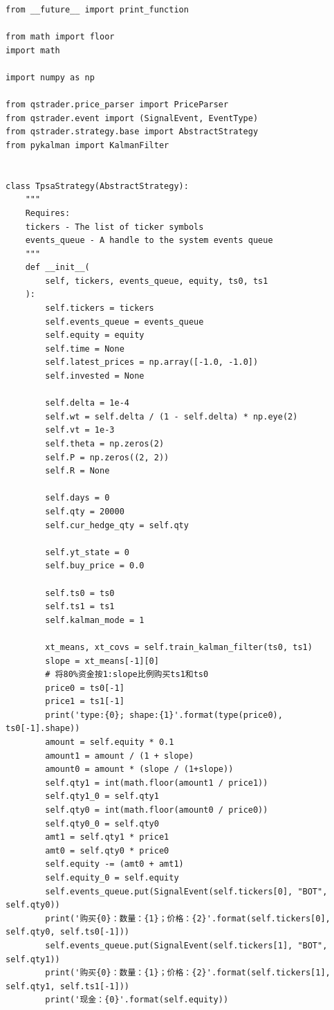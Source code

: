 \documentclass{article}
\begin{document}
\begin{lstlisting}
from __future__ import print_function

from math import floor
import math

import numpy as np

from qstrader.price_parser import PriceParser
from qstrader.event import (SignalEvent, EventType)
from qstrader.strategy.base import AbstractStrategy
from pykalman import KalmanFilter


class TpsaStrategy(AbstractStrategy):
    """
    Requires:
    tickers - The list of ticker symbols
    events_queue - A handle to the system events queue
    """
    def __init__(
        self, tickers, events_queue, equity, ts0, ts1
    ):
        self.tickers = tickers
        self.events_queue = events_queue
        self.equity = equity
        self.time = None
        self.latest_prices = np.array([-1.0, -1.0])
        self.invested = None

        self.delta = 1e-4
        self.wt = self.delta / (1 - self.delta) * np.eye(2)
        self.vt = 1e-3
        self.theta = np.zeros(2)
        self.P = np.zeros((2, 2))
        self.R = None

        self.days = 0
        self.qty = 20000
        self.cur_hedge_qty = self.qty
        
        self.yt_state = 0
        self.buy_price = 0.0
        
        self.ts0 = ts0
        self.ts1 = ts1
        self.kalman_mode = 1
        
        xt_means, xt_covs = self.train_kalman_filter(ts0, ts1)
        slope = xt_means[-1][0]
        # 将80%资金按1:slope比例购买ts1和ts0
        price0 = ts0[-1]
        price1 = ts1[-1]
        print('type:{0}; shape:{1}'.format(type(price0), ts0[-1].shape))
        amount = self.equity * 0.1
        amount1 = amount / (1 + slope)
        amount0 = amount * (slope / (1+slope))
        self.qty1 = int(math.floor(amount1 / price1))
        self.qty1_0 = self.qty1
        self.qty0 = int(math.floor(amount0 / price0))
        self.qty0_0 = self.qty0
        amt1 = self.qty1 * price1
        amt0 = self.qty0 * price0
        self.equity -= (amt0 + amt1)
        self.equity_0 = self.equity
        self.events_queue.put(SignalEvent(self.tickers[0], "BOT", self.qty0))
        print('购买{0}：数量：{1}；价格：{2}'.format(self.tickers[0], self.qty0, self.ts0[-1]))
        self.events_queue.put(SignalEvent(self.tickers[1], "BOT", self.qty1))
        print('购买{0}：数量：{1}；价格：{2}'.format(self.tickers[1], self.qty1, self.ts1[-1]))
        print('现金：{0}'.format(self.equity))
        

\end{lstlisting}
\end{document}

